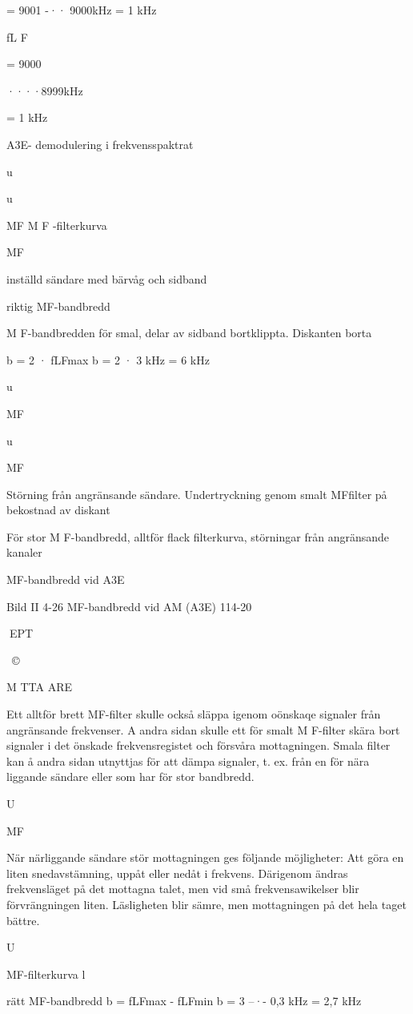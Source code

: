 \documentclass[a4paper,twoside,twocolumn,openright]{book}
\begin{document}
{{{= 9001 -·· 9000kHz = 1 kHz

fL F

= 9000

····8999kHz

= 1 kHz

A3E- demodulering i frekvensspaktrat

u

u

MF
M F -filterkurva

MF

inställd sändare
med bärvåg och sidband

riktig MF-bandbredd

M F-bandbredden för smal, delar av
sidband bortklippta. Diskanten borta

b = 2 · fLFmax
b = 2 · 3 kHz = 6 kHz

u

MF

u

MF

Störning från angränsande sändare.
Undertryckning genom smalt MFfilter på bekostnad av diskant

För stor M F-bandbredd, alltför
flack filterkurva, störningar från
angränsande kanaler

MF-bandbredd vid A3E

Bild II 4-26 MF-bandbredd vid AM (A3E)
114-20

EPT

~©~

M TTA ARE

Ett alltför brett MF-filter skulle också
släppa igenom oönskaqe signaler från angränsande frekvenser. A andra sidan skulle
ett för smalt M F-filter skära bort signaler i det
önskade frekvensregistet och försvåra mottagningen. Smala filter kan å andra sidan
utnyttjas för att dämpa signaler, t. ex. från en
för nära liggande sändare eller som har för
stor bandbredd.

U

MF

När närliggande sändare stör mottagningen
ges följande möjligheter:
Att göra en liten snedavstämning, uppåt
eller nedåt i frekvens. Därigenom ändras frekvensläget på det mottagna talet, men vid små frekvensawikelser blir
förvrängningen liten. Läsligheten blir
sämre, men mottagningen på det hela
taget bättre.

U

MF-filterkurva
l

rätt MF-bandbredd
b = fLFmax - fLFmin
b = 3 --·- 0,3 kHz = 2,7 kHz

}}}
\end{document}
